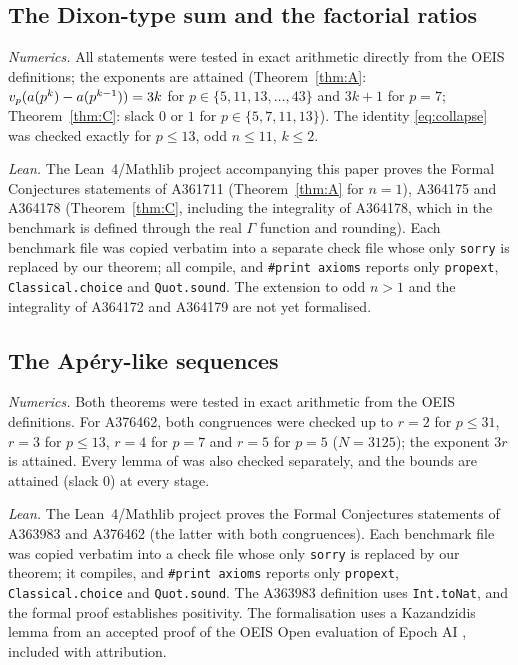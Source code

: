 \documentclass[11pt]{amsart}
\begin{document}
\subsection*{The Dixon-type sum and the factorial ratios}
\emph{Numerics.} All statements were tested in exact arithmetic directly from the OEIS definitions; the exponents are attained (Theorem~\ref{thm:A}: $v_p(a(p^k)-a(p^{k-1}))=3k$ for $p\in\{5,11,13,\dots,43\}$ and $3k+1$ for $p=7$; Theorem~\ref{thm:C}: slack $0$ or $1$ for $p\in\{5,7,11,13\}$). The identity \eqref{eq:collapse} was checked exactly for $p\le13$, odd $n\le11$, $k\le2$.

\emph{Lean.} The Lean~4/Mathlib project accompanying this paper \cite{repo} proves the Formal Conjectures statements of A361711 (Theorem~\ref{thm:A} for $n=1$), A364175 and A364178 (Theorem~\ref{thm:C}, including the integrality of A364178, which in the benchmark is defined through the real $\Gamma$ function and rounding). Each benchmark file was copied verbatim into a separate check file whose only \texttt{sorry} is replaced by our theorem; all compile, and \texttt{\#print axioms} reports only \texttt{propext}, \texttt{Classical.choice} and \texttt{Quot.sound}. The extension to odd $n>1$ and the integrality of A364172 and A364179 are not yet formalised.

\subsection*{The Ap\'ery-like sequences}
\emph{Numerics.} Both theorems were tested in exact arithmetic from the OEIS definitions. For A376462, both congruences were checked up to $r=2$ for $p\le31$, $r=3$ for $p\le13$, $r=4$ for $p=7$ and $r=5$ for $p=5$ ($N=3125$); the exponent $3r$ is attained. Every lemma of  was also checked separately, and the bounds are attained (slack $0$) at every stage.

\emph{Lean.} The Lean~4/Mathlib project \cite{repo} proves the Formal Conjectures statements of A363983 and A376462 (the latter with both congruences). Each benchmark file was copied verbatim into a check file whose only \texttt{sorry} is replaced by our theorem; it compiles, and \texttt{\#print axioms} reports only \texttt{propext}, \texttt{Classical.choice} and \texttt{Quot.sound}. The A363983 definition uses \texttt{Int.toNat}, and the formal proof establishes positivity. The formalisation uses a Kazandzidis lemma from an accepted proof of the OEIS Open evaluation of Epoch AI \cite{adamczewski2026,epoch}, included with attribution.
\end{document}
